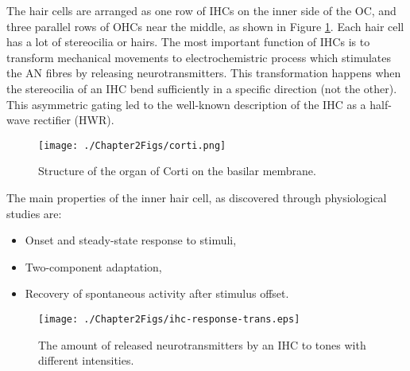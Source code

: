 \documentclass[11pt]{article}
\begin{document}
The hair cells are arranged as one row of IHCs on the inner side of
the OC, and three parallel rows of OHCs near the middle, as shown in
Figure \ref{fig:corti}. Each hair cell has a lot of stereocilia or
hairs. The most important function of IHCs is to transform mechanical
movements to electrochemistric process which stimulates the AN fibres
by releasing neurotransmitters. This transformation happens when the
stereocilia of an IHC bend sufficiently in a specific direction (not
the other). This asymmetric gating led to the well-known description
of the IHC as a half-wave rectifier (HWR).


\begin{figure}[htb]
\centering
\texttt{[image: ./Chapter2Figs/corti.png]}
\caption{\label{fig:corti}Structure of the organ of Corti on the basilar membrane\cite{BritannicaOrganOfCorti}.}
\end{figure}

The main properties of the inner hair cell, as discovered through
physiological studies are:

\begin{itemize}
\item Onset and steady-state response to stimuli,
\item Two-component adaptation,
\item Recovery of spontaneous activity after stimulus offset.
\end{itemize}

\begin{figure}[htb]
\centering
\texttt{[image: ./Chapter2Figs/ihc-response-trans.eps]}
\caption{\label{fig:ihc-response}The amount of released neurotransmitters by an IHC to tones with different intensities.}
\end{figure}
\end{document}
